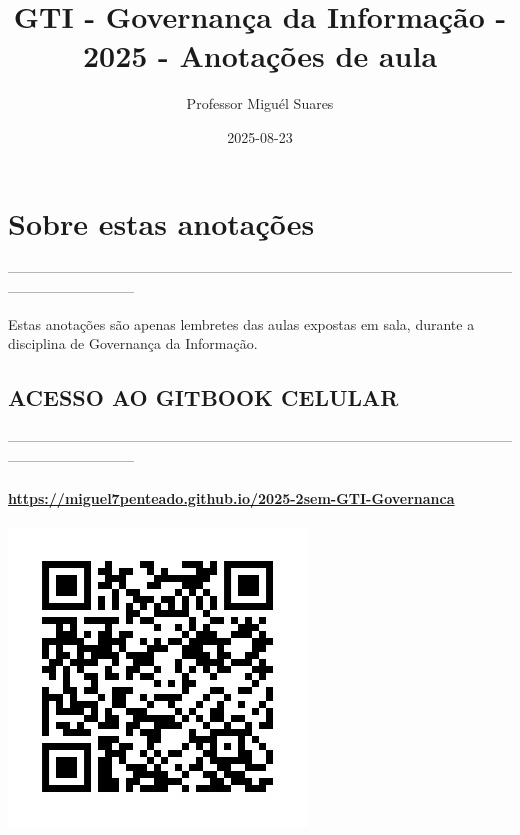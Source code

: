 \documentclass[
]{book}
\title{GTI - Governança da Informação - 2025 - Anotações de aula}
\author{Professor Miguél Suares}
\date{2025-08-23}
\begin{document}
\maketitle

{
\setcounter{tocdepth}{1}
\tableofcontents
}
\chapter*{Sobre estas anotações}\label{sobre-estas-anotauxe7uxf5es}

---------------------------------------------------------------------------------------------------------------------------------------

Estas anotações são apenas lembretes das aulas expostas em sala, durante a disciplina de Governança da Informação.

\section{ACESSO AO GITBOOK CELULAR}\label{acesso-ao-gitbook-celular}

---------------------------------------------------------------------------------------------------------------------------------------

\subsubsection{\texorpdfstring{\url{https://miguel7penteado.github.io/2025-2sem-GTI-Governanca}}{https://miguel7penteado.github.io/2025-2sem-GTI-Governanca}}\label{httpsmiguel7penteado.github.io2025-2sem-gti-governanca}

\includegraphics{images/qr-code-disciplina.jpg}
\end{document}
